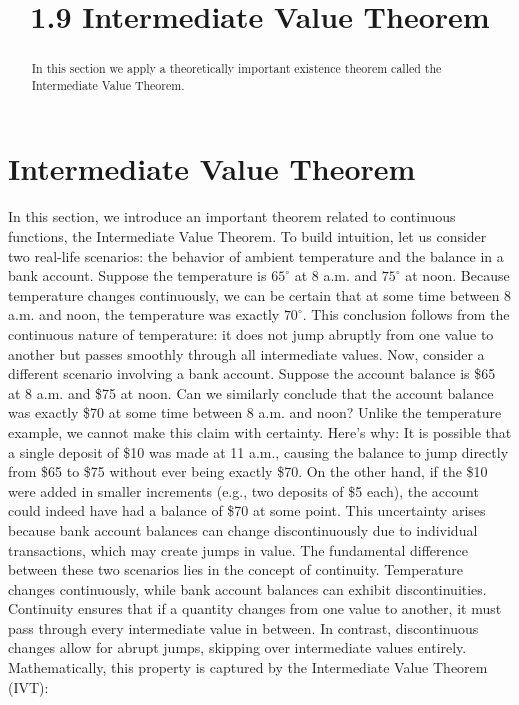 \documentclass[handout]{ximera}
\title{1.9 Intermediate Value Theorem}
\begin{document}
\begin{abstract}
In this section we apply a theoretically important existence theorem called the Intermediate Value Theorem.
\end{abstract}

\maketitle

\section{Intermediate Value Theorem}


In this section, we introduce an important theorem related to continuous functions, the Intermediate Value Theorem. 
To build intuition, let us consider two real-life scenarios: the behavior of ambient temperature and the balance in a bank account.
Suppose the temperature is \(65^\circ\) at 8 a.m. and \(75^\circ\) at noon. Because temperature changes continuously, 
we can be certain that at some time between 8 a.m. and noon, the temperature was exactly \(70^\circ\). 
This conclusion follows from the continuous nature of temperature: it does not jump abruptly from one value to another but passes smoothly through all intermediate values.
Now, consider a different scenario involving a bank account. Suppose the account balance is \$65 at 8 a.m. and \$75 at noon. 
Can we similarly conclude that the account balance was exactly \$70 at some time between 8 a.m. and noon? Unlike the temperature example, we cannot make this claim with certainty. 
Here’s why: It is possible that a single deposit of \$10 was made at 11 a.m., causing the balance to jump directly from \$65 to \$75 without ever being exactly \$70. 
On the other hand, if the \$10 were added in smaller increments (e.g., two deposits of \$5 each), the account could indeed have had a balance of \$70 at some point. 
This uncertainty arises because bank account balances can change discontinuously due to individual transactions, which may create jumps in value.
The fundamental difference between these two scenarios lies in the concept of continuity. 
Temperature changes continuously, while bank account balances can exhibit discontinuities. 
Continuity ensures that if a quantity changes from one value to another, it must pass through every intermediate value in between. 
In contrast, discontinuous changes allow for abrupt jumps, skipping over intermediate values entirely.
Mathematically, this property is captured by the Intermediate Value Theorem (IVT):
\end{document}
